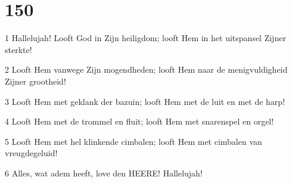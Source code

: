 \chapter{150}

\par 1 Hallelujah! Looft God in Zijn heiligdom; looft Hem in het uitspansel Zijner sterkte!
\par 2 Looft Hem vanwege Zijn mogendheden; looft Hem naar de menigvuldigheid Zijner grootheid!
\par 3 Looft Hem met geklank der bazuin; looft Hem met de luit en met de harp!
\par 4 Looft Hem met de trommel en fluit; looft Hem met snarenspel en orgel!
\par 5 Looft Hem met hel klinkende cimbalen; looft Hem met cimbalen van vreugdegeluid!
\par 6 Alles, wat adem heeft, love den HEERE! Hallelujah!




